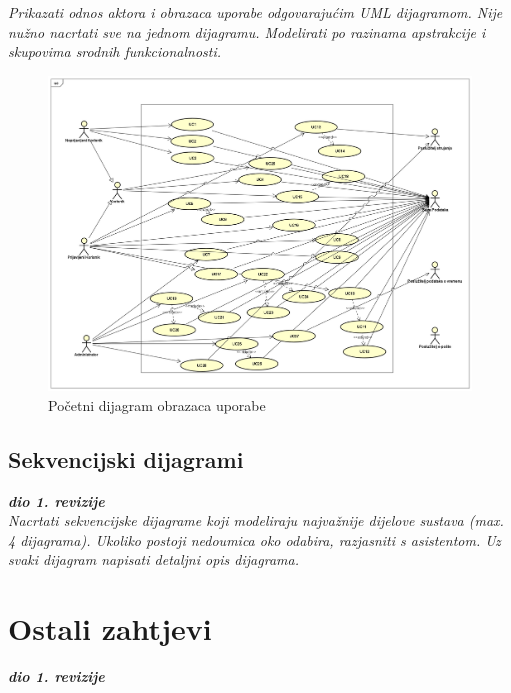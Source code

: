 					\textit{Prikazati odnos aktora i obrazaca uporabe odgovarajućim UML dijagramom. Nije nužno nacrtati sve na jednom dijagramu. Modelirati po razinama apstrakcije i skupovima srodnih funkcionalnosti.}
					\begin{figure}
						\includegraphics[width=\linewidth]{Slike/UseCaseDiagram.png}
						\caption{Početni dijagram obrazaca uporabe}
					\end{figure}
				\eject		
				
			\subsection{Sekvencijski dijagrami}
				
				\textbf{\textit{dio 1. revizije}}\\
				
				\textit{Nacrtati sekvencijske dijagrame koji modeliraju najvažnije dijelove sustava (max. 4 dijagrama). Ukoliko postoji nedoumica oko odabira, razjasniti s asistentom. Uz svaki dijagram napisati detaljni opis dijagrama.}
				\eject
	
		\section{Ostali zahtjevi}
		
			\textbf{\textit{dio 1. revizije}}\\
		 

